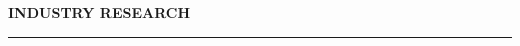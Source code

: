\documentclass{resume} %
\begin{document}
\medskip
\MakeUppercase{{\bf Industry Research}}
\medskip
\hrule

\end{document}
